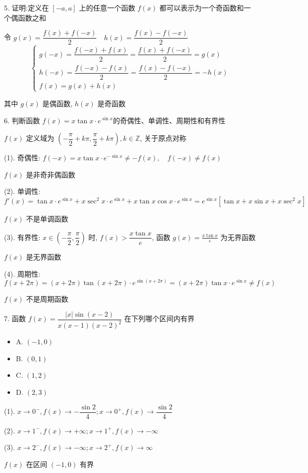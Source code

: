 5. 证明:定义在 $[-a,a]$ 上的任意一个函数 $f(x)$ 都可以表示为一个奇函数和一个偶函数之和
\begin{solution}

	令 $g(x)= \dfrac{f(x)+f(-x)}{2}\quad h(x)=\dfrac{f(x)-f(-x)}{2}$
	$$
	\begin{cases}
		g(-x)=\dfrac{f(-x)+f(x)}{2}=\dfrac{f(x)+f(-x)}{2}=g(x)\\
		h(-x)=\dfrac{f(-x)-f(x)}{2}=\dfrac{f(x)-f(-x)}{2}=-h(x)\\
		f(x) = g(x)+h(x)
	\end{cases}
	$$
	
	其中 $g(x)$ 是偶函数, $h(x)$ 是奇函数
\end{solution}

6. 判断函数 $f(x)=x\tan x\cdot e^{\sin x}$的奇偶性、单调性、周期性和有界性
\begin{solution}

	$f(x)$ 定义域为 $(-\dfrac{\pi}{2}+k\pi,\dfrac{\pi}{2}+k\pi),k\in \mathbb{Z}$, 关于原点对称
	
	(1). 奇偶性: $f(-x) = x\tan x\cdot e^{-\sin x}\neq -f(x),\quad f(-x)\neq f(x)$

	$f(x)$ 是非奇非偶函数

	(2). 单调性: $f'(x) = \tan x\cdot e^{\sin x}+x\sec^{2}x\cdot e^{\sin x}+x\tan x\cos x\cdot e^{\sin x}=e^{\sin x}\left[\tan x+x\sin x+x\sec^{2}x\right]$

	$f(x)$ 不是单调函数

	(3). 有界性: $x\in(-\dfrac{\pi}{2},\dfrac{\pi}{2})$ 时, $f(x) > \dfrac{x\tan x}{e}$, 函数 $g(x)=\frac{x\tan x}{e}$ 为无界函数

	$f(x)$ 是无界函数

	(4). 周期性: $f(x+2\pi) = (x+2\pi)\tan(x+2\pi)\cdot e^{\sin(x+2\pi)} = (x+2\pi)\tan x\cdot e^{\sin x} \neq f(x)$

	$f(x)$ 不是周期函数
\end{solution}

7. 函数 $f(x)=\dfrac{|x|\sin(x-2)}{x(x-1)(x-2)^{2}}$ 在下列哪个区间内有界

\begin{itemize}
	\item A. $(-1,0)$
	\item B. $(0,1)$
	\item C. $(1,2)$
	\item D. $(2,3)$
\end{itemize}
\begin{solution}

	(1). $x\to 0^{-}, f(x)\to -\dfrac{\sin 2}{4}; x\to 0^{+}, f(x)\to \dfrac{\sin 2}{4}$

	(2). $x\to 1^{-}, f(x)\to +\infty; x\to 1^{+}, f(x)\to -\infty$

	(3). $x\to 2^{-}, f(x)\to -\infty; x\to 2^{+}, f(x)\to \infty$

	$f(x)$ 在区间 $(-1,0)$ 有界
\end{solution}

